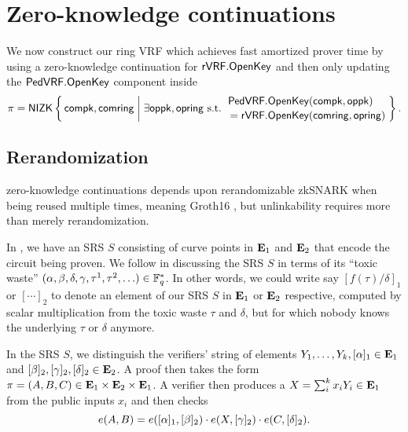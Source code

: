 
\section{Zero-knowledge continuations}
\label{sec:rvrf_cont}

\newcommand\rrSNARK{\primalgo{Groth16}\xspace}
\newcommand\pifast{\ensuremath{\pi_{\mathtt{fast}}}}
\newcommand\pisafe{\ensuremath{\pi_{\mathtt{safe}}}}

We now construct our ring VRF which achieves fast amortized prover time
by using a zero-knowledge continuation for ${\mathsf{rVRF}}.{\mathsf{OpenKey}}$ and then
only updating the ${\mathsf{PedVRF}}.{\mathsf{OpenKey}}$ component inside
$$ \pi = \NIZK \Setst{ \compk, \comring }{
 \exists \openpk,\openring \textrm{\ s.t.\ } 
 \genfrac{}{}{0pt}{}{\PedVRF.\OpenKey(\compk,\openpk) \quad}{\,\, = \rVRF.\OpenKey(\comring,\openring)}
} \mathperiod $$

\subsection{Rerandomization}

zero-knowledge continuations depends upon rerandomizable zkSNARK
when being reused multiple times, meaning Groth16 \cite{groth16},
but unlinkability requires more than merely rerandomization.

In \cite{groth16}, we have an SRS $S$ consisting of curve points
 in ${\mathbf{E}}_1$ and ${\mathbf{E}}_2$ that encode the circuit being proven. 
We follow \cite{groth16} in discussing the SRS $S$ in terms of
its ``toxic waste''
 $(\alpha,\beta,\delta,\gamma,\tau^1,\tau^2,\ldots) \in \mathbb{F}_q^*$.
In other words, we could write say $[ f(\tau)/\delta ]_1$ or $[\cdots]_2$
to denote an element of our SRS $S$ in ${\mathbf{E}}_1$ or ${\mathbf{E}}_2$ respective,
computed by scalar multiplication from the toxic waste $\tau$ and $\delta$,
 but for which nobody knows the underlying $\tau$ or $\delta$ anymore.

In the SRS $S$, we distinguish the verifiers' string of elements
 $Y_1,\ldots,Y_k, [\alpha]_1 \in {\mathbf{E}}_1$ and
 $[\beta]_2, [\gamma]_2, [\delta]_2 \in {\mathbf{E}}_2$.
A \cite{groth16} proof then takes the form 
 $\pi = (A,B,C) \in {\mathbf{E}}_1 \times {\mathbf{E}}_2 \times {\mathbf{E}}_1$.
A verifier then produces a $X = \sum_i^k x_i Y_i \in {\mathbf{E}}_1$ from
 the public inputs $x_i$ and then checks 
$$ e(A,B) = e([\alpha]_1, [\beta]_2) \cdot
 e(X, [\gamma]_2) \cdot e(C, [\delta]_2) . $$

